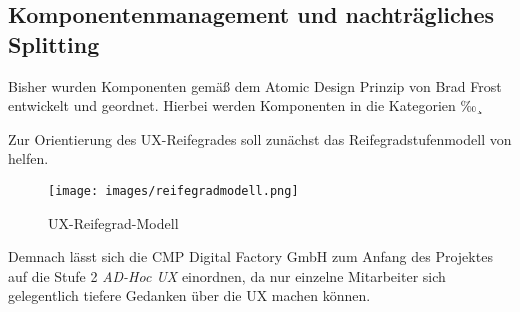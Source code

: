 \subsection{Komponentenmanagement und nachträgliches Splitting}
Bisher wurden Komponenten gemäß dem Atomic Design Prinzip von Brad Frost entwickelt und geordnet. Hierbei werden Komponenten in die Kategorien ‰¸



Zur Orientierung des UX-Reifegrades soll zunächst das Reifegradstufenmodell von helfen.

\begin{figure}[!ht]
	\centering
		\texttt{[image: images/reifegradmodell.png]}
	\caption{UX-Reifegrad-Modell \citep{WeichertQuintBartelUXManagement}}
	\label{fig:box}
\end{figure}

Demnach lässt sich die CMP Digital Factory GmbH zum Anfang des Projektes auf die Stufe 2 \textit{AD-Hoc UX} einordnen, da nur einzelne Mitarbeiter sich gelegentlich tiefere Gedanken über die UX machen können.